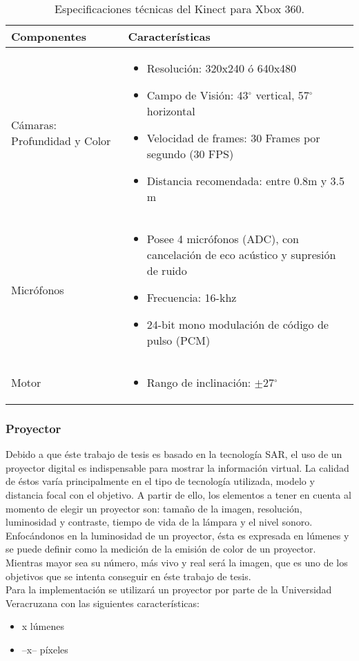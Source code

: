 \documentclass[a4paper,openright,12pt]{report}
\begin{document}
\begin{table}[H]
	\centering
	\begin{tabular}{>{\centering\arraybackslash}m{6cm} >{\arraybackslash}m{7cm} }
		\hline
		Componentes & Características\\
		\hline \hline
		Cámaras: Profundidad y Color
		&
\begin{itemize}
	\item Resolución: 320x240 ó 640x480
	\item Campo de Visión: 43$^{\circ}$ vertical, 57$^{\circ}$ horizontal
	\item Velocidad de frames: 30 Frames por segundo (30 FPS)
	\item Distancia recomendada: entre 0.8m y 3.5 m
\end{itemize}	
		\\
		\hline
		Micrófonos & 
		\begin{itemize}
			\item Posee 4 micrófonos (ADC), con cancelación de eco acústico y supresión de ruido
			\item Frecuencia: 16-khz
			\item 24-bit mono modulación de código de pulso (PCM)
		\end{itemize}
		 \\
		\hline
		Motor &
		\begin{itemize}
			\item  Rango de inclinación: $ \pm $27$^{\circ}$ 
		\end{itemize}\\
		\hline
	\end{tabular}
	\caption{Especificaciones técnicas del Kinect para Xbox 360.}
	\label{tabla:especKinect}
\end{table}
\subsubsection{Proyector}
Debido a que éste trabajo de tesis es basado en la tecnología SAR, el uso de un proyector digital es indispensable para mostrar la información virtual. La calidad de éstos varía principalmente en el tipo de tecnología utilizada, modelo y distancia focal con el objetivo. A partir de ello, los elementos a tener en cuenta al momento de elegir un proyector son: tamaño de la imagen, resolución, luminosidad y contraste, tiempo de vida de la lámpara y el nivel sonoro. Enfocándonos en la luminosidad de un proyector, ésta es expresada en lúmenes y se puede definir como la medición de la emisión de color de un proyector. Mientras mayor sea su número, más vivo y real será la imagen, que es uno de los objetivos que se intenta conseguir en éste trabajo de tesis.\\
Para la implementación se utilizará un proyector por parte de la Universidad Veracruzana con las siguientes características:
\begin{itemize}
	\item x lúmenes
	\item --x-- píxeles
\end{itemize}
\end{document}
